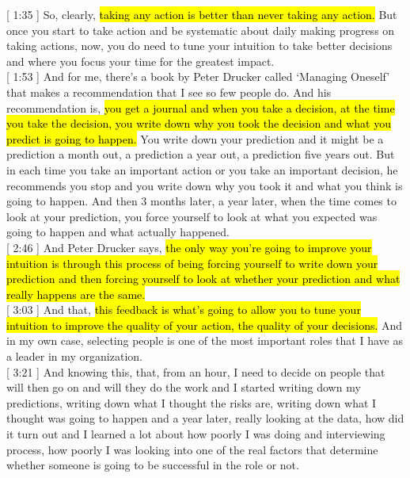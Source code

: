 \documentclass[a4paper,12pt]{article}
\begin{document}
[ 1:35 ] So, clearly, \hl{taking any action is better than never taking any action.} But once you start to take action and be systematic about daily making progress on taking actions, now, you do need to tune your intuition to take better decisions and where you focus your time for the greatest impact. \\

[ 1:53 ] And for me, there's a book by Peter Drucker called `Managing Oneself' that makes a recommendation that I see so few people do. And his recommendation is, \hl{you get a journal and when you take a decision, at the time you take the decision, you write down why you took the decision and what you predict is going to happen.} You write down your prediction and it might be a prediction a month out, a prediction a year out, a prediction five years out. But in each time you take an important action or you take an important decision, he recommends you stop and you write down why you took it and what you think is going to happen. And then 3 months later, a year later, when the time comes to look at your prediction, you force yourself to look at what you expected was going to happen and what actually happened. \\

[ 2:46 ] And Peter Drucker says, \hl{the only way you're going to improve your intuition is through this process of being forcing yourself to write down your prediction and then forcing yourself to look at whether your prediction and what really happens are the same.} \\

[ 3:03 ] And that, \hl{this feedback is what's going to allow you to tune your intuition to improve the quality of your action, the quality of your decisions.} And in my own case, selecting people is one of the most important roles that I have as a leader in my organization. \\

[ 3:21 ] And knowing this, that, from an hour, I need to decide on people that will then go on and will they do the work and I started writing down my predictions, writing down what I thought the risks are, writing down what I thought was going to happen and a year later, really looking at the data, how did it turn out and I learned a lot about how poorly I was doing and interviewing process, how poorly I was looking into one of the real factors that determine whether someone is going to be successful in the role or not. \\
\end{document}
